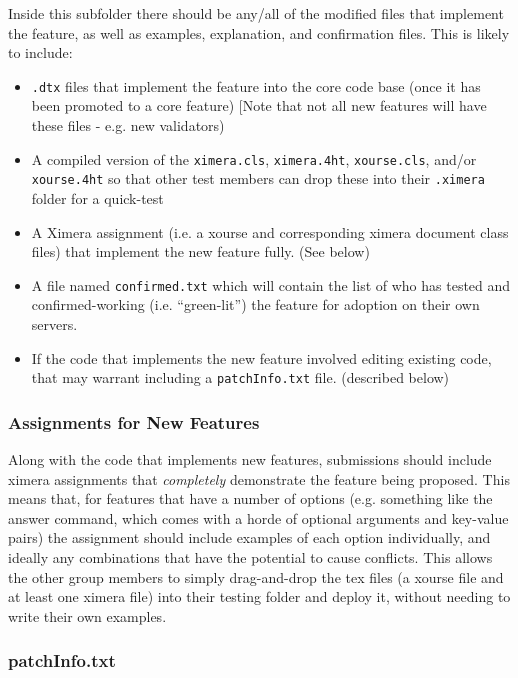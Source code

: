 \documentclass{ximera}
\begin{document}
        Inside this subfolder there should be any/all of the modified files that implement the feature, as well as examples, explanation, and confirmation files. This is likely to include:
        \begin{itemize}
            \item \texttt{.dtx} files that implement the feature into the core code base (once it has been promoted to a core feature) [Note that not all new features will have these files - e.g. new validators)
            \item A compiled version of the \texttt{ximera.cls}, \texttt{ximera.4ht}, \texttt{xourse.cls}, and/or \texttt{xourse.4ht} so that other test members can drop these into their \texttt{.ximera} folder for a quick-test
            \item A Ximera assignment (i.e. a xourse and corresponding ximera document class files) that implement the new feature fully. (See below)
            \item A file named \texttt{confirmed.txt} which will contain the list of who has tested and confirmed-working (i.e. ``green-lit'') the feature for adoption on their own servers.
            \item If the code that implements the new feature involved editing existing code, that may warrant including a \texttt{patchInfo.txt} file. (described below)
        \end{itemize}
        
        \subsubsection{Assignments for New Features}
            
            Along with the code that implements new features, submissions should include ximera assignments that \textit{completely} demonstrate the feature being proposed. This means that, for features that have a number of options (e.g. something like the answer command, which comes with a horde of optional arguments and key-value pairs) the assignment should include examples of each option individually, and ideally any combinations that have the potential to cause conflicts. This allows the other group members to simply drag-and-drop the tex files (a xourse file and at least one ximera file) into their testing folder and deploy it, without needing to write their own examples. \\
        
        \subsubsection{patchInfo.txt}
            
\end{document}
